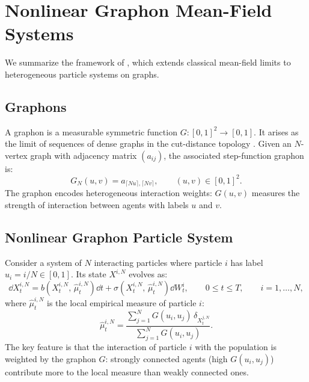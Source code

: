 \documentclass[11pt]{article}
\begin{document}
\section{Nonlinear Graphon Mean-Field Systems}\label{sec:appendix-graphon}

We summarize the framework of \citet{coppini2025graphon}, which extends classical mean-field limits to heterogeneous particle systems on graphs.

\subsection{Graphons}

A graphon is a measurable symmetric function $G : [0,1]^2 \to [0,1]$. It arises as the limit of sequences of dense graphs in the cut-distance topology \citep{lovasz2012large}. Given an $N$-vertex graph with adjacency matrix $(a_{ij})$, the associated step-function graphon is:
\begin{equation}
  G_N(u,v) = a_{\lceil Nu \rceil, \lceil Nv \rceil}, \qquad (u,v) \in [0,1]^2.
\end{equation}
The graphon encodes heterogeneous interaction weights: $G(u,v)$ measures the strength of interaction between agents with labels $u$ and $v$.

\subsection{Nonlinear Graphon Particle System}

Consider a system of $N$ interacting particles where particle $i$ has label $u_i = i/N \in [0,1]$. Its state $X^{i,N}$ evolves as:
\begin{equation}\label{eq:graphon-particle}
  \dd X_t^{i,N} = b\!\left(X_t^{i,N}, \, \hat{\mu}_t^{i,N}\right)\dd t + \sigma\!\left(X_t^{i,N}, \, \hat{\mu}_t^{i,N}\right)\dd W_t^i, \qquad 0 \leq t \leq T, \qquad i = 1, \ldots, N,
\end{equation}
where $\hat{\mu}_t^{i,N}$ is the local empirical measure of particle $i$:
\begin{equation}\label{eq:local-empirical}
  \hat{\mu}_t^{i,N} = \frac{\sum_{j=1}^N G(u_i, u_j)\,\delta_{X_t^{j,N}}}{\sum_{j=1}^N G(u_i, u_j)}.
\end{equation}
The key feature is that the interaction of particle $i$ with the population is weighted by the graphon $G$: strongly connected agents (high $G(u_i, u_j)$) contribute more to the local measure than weakly connected ones.
\end{document}
